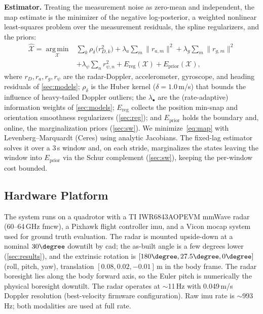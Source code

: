 \textbf{Estimator.}
Treating the measurement noise as zero-mean and independent, the
\ac{map} estimate is the minimizer of the negative
log-posterior, a weighted nonlinear least-squares problem over the
measurement residuals, the spline regularizers, and the priors:
\begin{equation}
\begin{aligned}
  \hat{\mathcal{X}} = \operatorname*{arg\,min}_{\mathcal{X}}
    & \sum_{k}\rho_\delta\!\bigl(r_{D,k}^2\bigr)
    + \lambda_a\!\sum_{m}\lVert r_{a,m}\rVert^2
    + \lambda_g\!\sum_{m}\lVert r_{g,m}\rVert^2 \\
    & + \lambda_\psi\!\sum_{n} r_{\psi,n}^2
    + E_{\text{reg}}(\mathcal{X})
    + E_{\text{prior}}(\mathcal{X}),
\end{aligned}
\label{eq:map}
\end{equation}
where $r_D,r_a,r_g,r_\psi$ are the radar-Doppler, accelerometer,
gyroscope, and heading residuals of \autoref{sec:models};
$\rho_\delta$ is the Huber kernel ($\delta{=}1.0$\,m/s) that bounds the
influence of heavy-tailed Doppler outliers; the $\lambda_\bullet$ are the
(rate-adaptive) information weights of \autoref{sec:models};
$E_{\text{reg}}$ collects the position min-snap and orientation
smoothness regularizers (\autoref{sec:reg}); and $E_{\text{prior}}$
holds the boundary and, online, the marginalization priors
(\autoref{sec:sw}).  We minimize~\eqref{eq:map} with
Levenberg--Marquardt (Ceres) using analytic Jacobians.  The fixed-lag
estimator solves it over a 3\,s window and, on each stride, marginalizes
the states leaving the window into $E_{\text{prior}}$ via the Schur
complement (\autoref{sec:sw}), keeping the per-window cost bounded.

\subsection{Hardware Platform}
The system runs on a quadrotor with a TI IWR6843AOPEVM
mmWave radar (60--64\,GHz \ac{fmcw}), a Pixhawk flight
controller \ac{imu}, and a Vicon \ac{mocap} system used for ground
truth evaluation.  The radar is mounted upside-down at a nominal $30\degree$ downtilt by
\ac{cad}; the as-built angle is a few degrees lower (\autoref{sec:results}),
and the extrinsic rotation is $[180\degree, 27.5\degree, 0\degree]$
(roll, pitch, yaw), translation $[0.08, 0.02, -0.01]$\,m in the body
frame.  The radar boresight lies along the body forward axis, so the
Euler pitch is numerically the physical boresight downtilt.  The radar operates at $\sim$11\,Hz with 0.049\,m/s Doppler
resolution (best-velocity firmware configuration).  Raw \ac{imu} rate
is $\sim$993\,Hz; both modalities are used at full rate.

